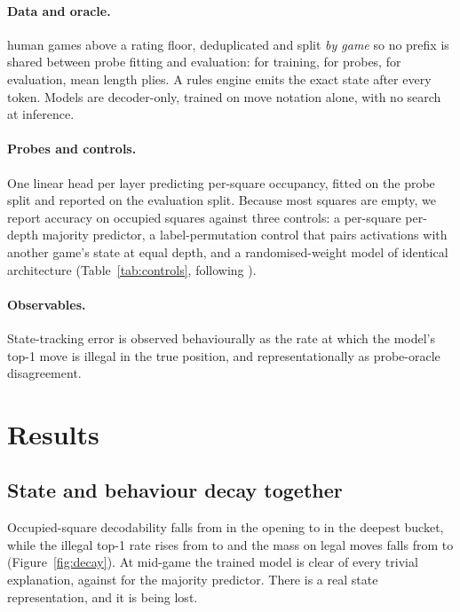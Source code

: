 \documentclass[10pt]{article}
\begin{document}
\paragraph{Data and oracle.}  human games above a rating floor,
deduplicated and split \emph{by game} so no prefix is shared between probe
fitting and evaluation:  for training,  for
probes,  for evaluation, mean length  plies. A
rules engine emits the exact state after every token. Models are decoder-only,
trained on move notation alone, with no search at inference.

\paragraph{Probes and controls.} One linear head per layer predicting per-square
occupancy, fitted on the probe split and reported on the evaluation split.
Because most squares are empty, we report accuracy on occupied squares against
three controls: a per-square per-depth majority predictor, a label-permutation
control that pairs activations with another game's state at equal depth, and a
randomised-weight model of identical architecture
(Table~\ref{tab:controls}, following \citealp{hewitt2019designing}).

\paragraph{Observables.} State-tracking error is observed behaviourally as the
rate at which the model's top-1 move is illegal in the true position, and
representationally as probe-oracle disagreement.

\section{Results}

\subsection{State and behaviour decay together}



Occupied-square decodability falls from  in the opening to
 in the deepest bucket, while the illegal top-1 rate rises from
 to  and the mass on legal moves falls from
 to  (Figure~\ref{fig:decay}). At mid-game the
trained model is clear of every trivial explanation,  against
 for the majority predictor. There is a real state
representation, and it is being lost.
\end{document}

